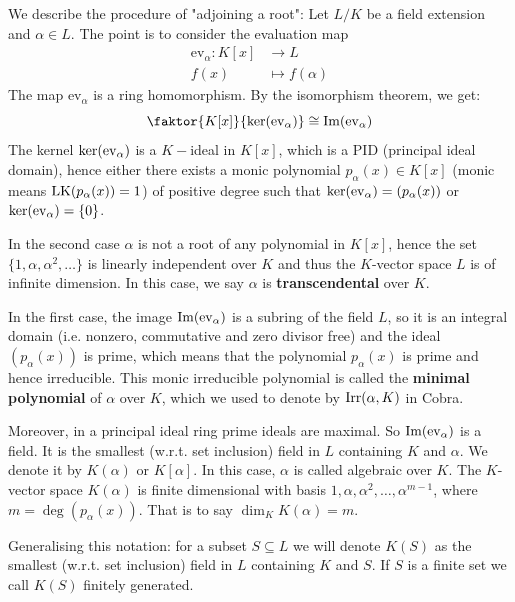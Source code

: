 \documentclass[twoside = false,	%
		headsepline,		%
		parskip = true,
		]{scrbook}						%
\begin{document}
        We describe the procedure of "adjoining a root":
        Let $L/K$ be a field extension and $\alpha \in L$. The point is to consider the evaluation map
        \begin{align*}
            \mathrm{ev}_\alpha: K[x] &\rightarrow L \\
                                f(x) &\mapsto f(\alpha)
        \end{align*}
        The map $\mathrm{ev}_\alpha$ is a ring homomorphism. By the isomorphism theorem, we get:
        \begin{equation*}
            \faktor{K[x]}{\Ker(\ev_\alpha)} \cong \Img(\ev_\alpha)
        \end{equation*}
        The kernel $\ker(\mathrm{ev}_\alpha)$ is a $K-$ideal in $K[x]$, which is a PID (principal ideal domain), hence either there exists a monic polynomial $p_\alpha(x) \in K[x]$ (monic means $\mathrm{LK}(p_\alpha(x))=1$) of positive degree such that $\mathrm{ker}(\mathrm{ev}_\alpha) = (p_\alpha(x))$ or $\ker(\mathrm{ev}_\alpha) = \{0\}$.
        
        In the second case $\alpha$ is not a root of any polynomial in $K[x]$, hence the set $\{1,\alpha,\alpha^2,\dots\}$ is linearly independent over $K$ and thus the $K$-vector space $L$ is of infinite dimension. In this case, we say $\alpha$ is \textbf{transcendental} over $K$.
        
        In the first case, the image $\mathrm{Im}(\mathrm{ev}_\alpha)$ is a subring of the field $L$, so it is an integral domain (i.e. nonzero, commutative and zero divisor free) and the ideal $(p_\alpha(x))$ is prime, which means that the polynomial $p_\alpha(x)$ is prime and hence irreducible. This monic irreducible polynomial is called the \textbf{minimal polynomial} of $\alpha$ over $K$, which we used to denote by $\mathrm{Irr}(\alpha,K)$ in Cobra.
        
        Moreover, in a principal ideal ring prime ideals are maximal. So $\mathrm{Im}(\mathrm{ev}_\alpha)$ is a field. It is the smallest (w.r.t. set inclusion) field in $L$ containing $K$ and $\alpha$. We denote it by $K(\alpha)$ or $K[\alpha]$. In this case, $\alpha$ is called algebraic over $K$. The $K$-vector space $K(\alpha)$ is finite dimensional with basis $1,\alpha,\alpha^2,\dots,\alpha^{m-1}$, where $m=\deg\left(p_\alpha(x)\right)$. That is to say $\dim_K K(\alpha) = m$.
        
        Generalising this notation: for a subset $S \subseteq L$ we will denote $K(S)$ as the smallest (w.r.t. set inclusion) field in $L$ containing $K$ and $S$. If $S$ is a finite set we call $K(S)$ finitely generated.
        
\end{document}
